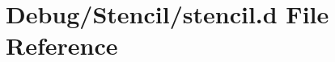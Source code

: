 \hypertarget{_debug_2_stencil_2stencil_8d}{\section{Debug/\-Stencil/stencil.d File Reference}
\label{d7/d5e/_debug_2_stencil_2stencil_8d}
}
